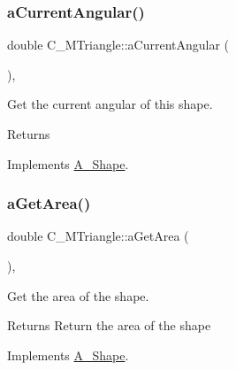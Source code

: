 \subsubsection{\texorpdfstring{a\+Current\+Angular()}{aCurrentAngular()}\hspace{0.1cm}{\footnotesize\ttfamily [2/2]}}
{\footnotesize\ttfamily double C\+\_\+\+M\+Triangle\+::a\+Current\+Angular (\begin{DoxyParamCaption}{ }\end{DoxyParamCaption})\hspace{0.3cm}{\ttfamily [override]}, {\ttfamily [virtual]}}



Get the current angular of this shape. 

\begin{DoxyReturn}{Returns}

\end{DoxyReturn}


Implements \hyperlink{classA__Shape_a80fa4e009c875dd0ba7fc5bfeeb43f98}{A\+\_\+\+Shape}.

\mbox{\label{classC__MTriangle_a1baff5085fc1b9822987e3fc307550ce}} 
\subsubsection{\texorpdfstring{a\+Get\+Area()}{aGetArea()}\hspace{0.1cm}{\footnotesize\ttfamily [1/2]}}
{\footnotesize\ttfamily double C\+\_\+\+M\+Triangle\+::a\+Get\+Area (\begin{DoxyParamCaption}{ }\end{DoxyParamCaption})\hspace{0.3cm}{\ttfamily [override]}, {\ttfamily [virtual]}}



Get the area of the shape. 

\begin{DoxyReturn}{Returns}
Return the area of the shape 
\end{DoxyReturn}


Implements \hyperlink{classA__Shape_a1b142ee2d873d6c217f65de1632e7b6e}{A\+\_\+\+Shape}.

\mbox{\label{classC__MTriangle_a1baff5085fc1b9822987e3fc307550ce}} 
